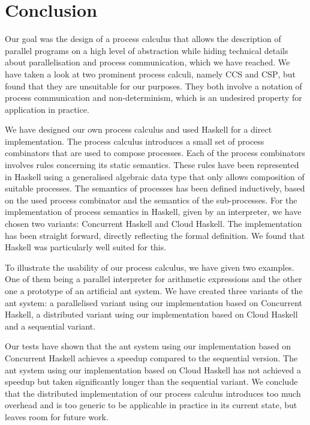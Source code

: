 \chapter{Conclusion}
Our goal was the design of a process calculus that allows the description of parallel programs on a high level of abstraction while hiding technical details about parallelisation and process communication, which we have reached. We have taken a look at two prominent process calculi, namely \textsc{CCS} and \textsc{CSP}, but found that they are unsuitable for our purposes. They both involve a notation of process communication and non-determinism, which is an undesired property for application in practice.

We have designed our own process calculus and used \textsf{Haskell} for a direct implementation. The process calculus introduces a small set of process combinators that are used to compose processes. Each of the process combinators involves rules concerning its static semantics. These rules have been represented in \textsf{Haskell} using a generalised algebraic data type that only allows composition of suitable processes. The semantics of processes has been defined inductively, based on the used process combinator and the semantics of the sub-processes. For the implementation of process semantics in \textsf{Haskell}, given by an interpreter, we have chosen two variants: \textsf{Concurrent Haskell} and \textsf{Cloud Haskell}. The implementation has been straight forward, directly reflecting the formal definition. We found that \textsf{Haskell} was particularly well suited for this.

To illustrate the usability of our process calculus, we have given two examples. One of them being a parallel interpreter for arithmetic expressions and the other one a prototype of an artificial ant system. We have created three variants of the ant system: a parallelised variant using our implementation based on \textsf{Concurrent Haskell}, a distributed variant using our implementation based on \textsf{Cloud Haskell} and a sequential variant.

Our tests have shown that the ant system using our implementation based on \textsf{Concurrent Haskell} achieves a speedup compared to the sequential version. The ant system using our implementation based on \textsf{Cloud Haskell} has not achieved a speedup but taken significantly longer than the sequential variant. We conclude that the distributed implementation of our process calculus introduces too much overhead and is too generic to be applicable in practice in its current state, but leaves room for future work.
